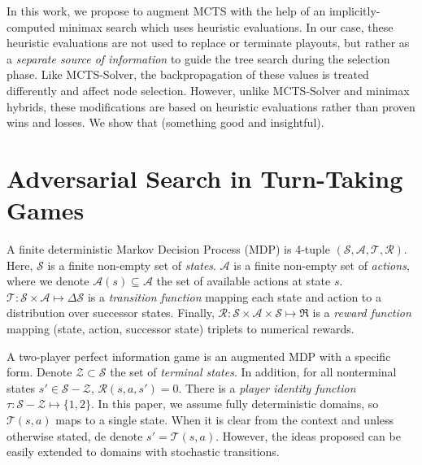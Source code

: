 \documentclass[letterpaper]{article}
\newcommand{\cA}{\mathcal{A}}
\newcommand{\cR}{\mathcal{R}}
\newcommand{\cS}{\mathcal{S}}
\newcommand{\cT}{\mathcal{T}}
\newcommand{\cZ}{\mathcal{Z}}
\begin{document}
In this work, we propose to augment MCTS with the help of an implicitly-computed minimax search which uses
heuristic evaluations. In our case, these heuristic evaluations are not used to replace or terminate playouts, but 
rather as a {\it separate source of information} to guide the tree search during the selection phase. Like MCTS-Solver, 
the backpropagation of these values is treated differently and affect node selection. However, unlike MCTS-Solver and 
minimax hybrids, these modifications are based on heuristic evaluations rather than proven wins and losses. 
We show that (something good and insightful). 

\section{Adversarial Search in Turn-Taking Games}


A finite deterministic Markov Decision Process (MDP) is 4-tuple $(\cS, \cA, \cT, \cR)$. Here, $\cS$ is a finite non-empty set of {\it states}. 
$\cA$ is a finite non-empty set of {\it actions}, where we denote $\cA(s) \subseteq \cA$ the set of available actions at state $s$. 
$\cT : \cS \times \cA \mapsto \Delta \cS$ is a {\it transition function} mapping 
each state and action to a distribution over successor states. Finally, $\cR : \cS \times \cA \times \cS \mapsto \Re$ 
is a {\it reward function} mapping (state, action, successor state) triplets to numerical rewards. 

A two-player perfect information game is an augmented MDP with a specific form. 
Denote $\cZ \subset \cS$ the set of {\it terminal states}. 
In addition, for all nonterminal states $s' \in \cS - \cZ$, $\cR(s,a,s') = 0$. 
There is a {\it player identity function} $\tau : \cS - \cZ \mapsto \{1,2\}$. 
In this paper, we assume fully deterministic domains, so $\cT(s,a)$ maps to a single state. 
When it is clear from the context and unless otherwise stated, de denote $s' = \cT(s,a)$. 
However, the ideas proposed can be easily extended to domains with stochastic transitions. 
\end{document}
